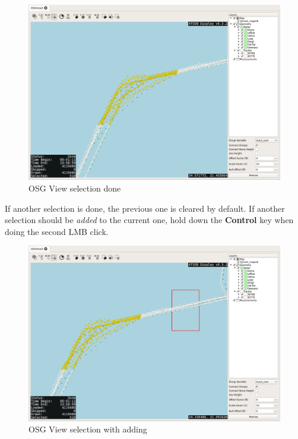 \begin{figure}[H]
    \hspace*{-2cm}
    \includegraphics[width=18cm,frame]{../screenshots/osgview_select2.png}
  \caption{OSG View selection done}
\end{figure}

If another selection is done, the previous one is cleared by default. If another selection should be \textit{added} to the current one, hold down the \textbf{Control} key when doing the second LMB click.

\begin{figure}[H]
    \hspace*{-2cm}
    \includegraphics[width=18cm,frame]{../screenshots/osgview_select_add1.png}
  \caption{OSG View selection with adding}
\end{figure}

